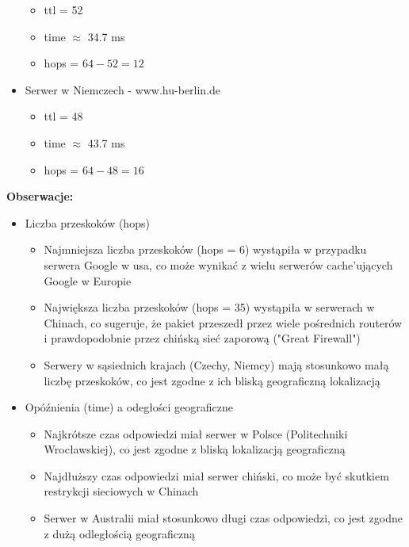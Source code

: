 \documentclass{article}
\begin{document}
\begin{itemize}
\begin{itemize}
        \item ttl = 52
        \item time $\approx$ 34.7 ms
        \item hops = $64 - 52 = 12$
    \end{itemize}
    \item Serwer w Niemczech - www.hu-berlin.de
    \begin{itemize}
        \item ttl = 48
        \item time $\approx$ 43.7 ms
        \item hops = $64 - 48 = 16$
    \end{itemize}
\end{itemize}
\vspace{1\baselineskip}
\textbf{Obserwacje:}
\vspace{1\baselineskip}
\begin{itemize}
    \item Liczba przeskoków (hops)
    \begin{itemize}
        \item Najmniejsza liczba przeskoków (hops = 6) wystąpiła w przypadku serwera Google w usa, co może wynikać z wielu serwerów cache'ujących Google w Europie
        \item Największa liczba przeskoków (hops = 35) wystąpiła w serwerach w Chinach, co sugeruje, że pakiet przeszedł przez wiele pośrednich routerów i
        prawdopodobnie przez chińską sieć zaporową ("Great Firewall")
        \item Serwery w sąsiednich krajach (Czechy, Niemcy) mają stosunkowo małą liczbę przeskoków, co jest zgodne z ich bliską geograficzną lokalizacją
    \end{itemize}
    \item Opóźnienia (time) a odegłości geograficzne
    \begin{itemize}
        \item Najkrótsze czas odpowiedzi miał serwer w Polsce (Politechniki Wrocławskiej), co jest zgodne z bliską lokalizacją geograficzną
        \item Najdłuższy czas odpowiedzi miał serwer chiński, co może być skutkiem restrykcji sieciowych w Chinach
        \item Serwer w Australii miał stosunkowo długi czas odpowiedzi, co jest zgodne z dużą odległością geograficzną
    \end{itemize}
\end{itemize}
\vspace{1\baselineskip}
\end{document}
